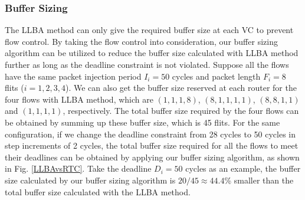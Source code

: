\documentclass[preprint]{elsarticle}
\begin{document}
\subsubsection{Buffer Sizing}
The LLBA method \cite{189} can only give the required buffer size at each VC to prevent flow control. By taking the flow control into consideration, our buffer sizing algorithm can be utilized to reduce the buffer size calculated with LLBA method further as long as the deadline constraint is not violated. Suppose all the flows have the same packet injection period $I_i=50$ cycles and packet length $F_i=8$ flits ($i=1,2,3,4$). We can also get the buffer size reserved at each router for the four flows with LLBA method, which are $(1,1,1,8)$, $(8,1,1,1,1)$, $(8,8,1,1)$ and $(1,1,1,1)$, respectively. The total buffer size required by the four flows can be obtained by summing up these buffer size, which is 45 flits. For the same configuration, if we change the deadline constraint from 28 cycles to 50 cycles in step increments of 2 cycles, the total buffer size required for all the flows to meet their deadlines can be obtained by applying our buffer sizing algorithm, as shown in Fig. \ref{LLBAvsRTC}. Take the deadline $D_i=50$ cycles as an example, the buffer size calculated by our buffer sizing algorithm is $20/45\approx44.4$\% smaller than the total buffer size calculated with the LLBA method.
\end{document}
